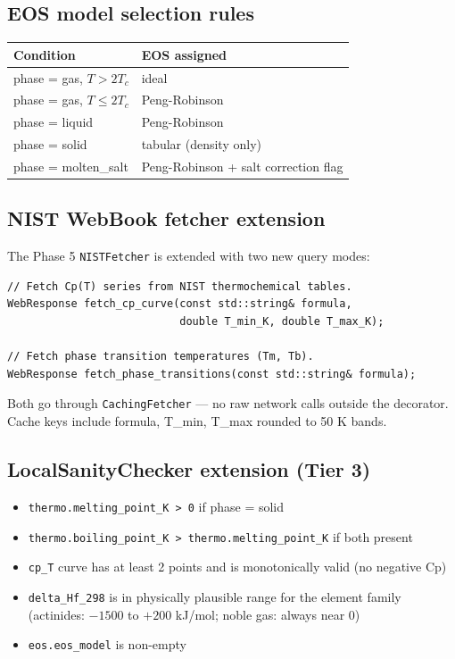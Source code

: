 \documentclass[11pt, a4paper]{article}
\begin{document}
\subsection{EOS model selection rules}

\begin{center}
\begin{tabular}{ll}
\toprule
\textbf{Condition} & \textbf{EOS assigned} \\
\midrule
phase = gas, $T > 2T_c$       & ideal \\
phase = gas, $T \leq 2T_c$    & Peng-Robinson \\
phase = liquid                 & Peng-Robinson \\
phase = solid                  & tabular (density only) \\
phase = molten\_salt            & Peng-Robinson + salt correction flag \\
\bottomrule
\end{tabular}
\end{center}

\subsection{NIST WebBook fetcher extension}

The Phase 5 \texttt{NISTFetcher} is extended with two new query modes:

\begin{lstlisting}
// Fetch Cp(T) series from NIST thermochemical tables.
WebResponse fetch_cp_curve(const std::string& formula,
						   double T_min_K, double T_max_K);

// Fetch phase transition temperatures (Tm, Tb).
WebResponse fetch_phase_transitions(const std::string& formula);
\end{lstlisting}

Both go through \texttt{CachingFetcher} --- no raw network calls outside the
decorator.  Cache keys include formula, T\_min, T\_max rounded to 50 K bands.

\subsection{LocalSanityChecker extension (Tier 3)}

\begin{itemize}[leftmargin=*, itemsep=2pt]
  \item \texttt{thermo.melting\_point\_K > 0} if phase = solid
  \item \texttt{thermo.boiling\_point\_K > thermo.melting\_point\_K} if both present
  \item \texttt{cp\_T} curve has at least 2 points and is monotonically valid
		(no negative Cp)
  \item \texttt{delta\_Hf\_298} is in physically plausible range for the element
		family (actinides: $-1500$ to $+200$ kJ/mol; noble gas: always near 0)
  \item \texttt{eos.eos\_model} is non-empty
\end{itemize}
\end{document}
